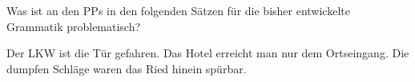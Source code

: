 Was ist an den PPs in den folgenden Sätzen für die bisher entwickelte Grammatik problematisch?

\Halbzeile


\begin{exe}
  \ex Der LKW ist  die Tür gefahren.
  \ex Das Hotel erreicht man nur  dem Ortseingang.
  \ex Die dumpfen Schläge waren  das Ried hinein spürbar.
\end{exe}

\newpage\hspace{1em}

